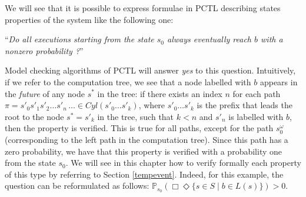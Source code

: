 \begin{example}
\begin{figure}[h]
\begin{minipage}{0.6\linewidth}
    \captionsetup{justification=centering}
    \label{ct2}
  \end{minipage}
\end{figure}
We will see that it is possible to express formulae in PCTL describing states properties of the system like the following one:
\begin{center}
``\textit{Do all executions starting from the state $s_0$ always eventually reach $b$ with a nonzero probability ?}''
\end{center}
Model checking algorithms of PCTL will answer \textit{yes} to this question.
Intuitively, if we refer to the computation tree,
we see that a node labelled with $b$ appears in the \textit{future} of any node $s^*$ in the tree: if there exists an index $n$ for each path $\pi = s'_0 s'_1 s'_2 \dots s'_n {\,\dots} \in Cyl(s'_0 \dots s'_k)$, where $s'_0 \dots s'_k$ is the prefix that leads the root to the node $s^* = s'_k$ in the tree, such that $k <n$ and $s'_n$ is labelled with $b$, then the property is verified. This is true for all paths,  except for the path $s_0^\omega$ (corresponding to the left path in the computation tree).
Since this path has a zero probability, we have that this property is verified with a probability one from the state $s_0$.
We will see in this chapter how to verify formally each property of this type by referring to Section \ref{tempevent}.
Indeed, for this example, the question can be reformulated as follows: $\mathbb{P}_{s_0}(\Box\Diamond \{ s \in S \; | \; b \in L(s)\}) > 0$.

\end{example}

